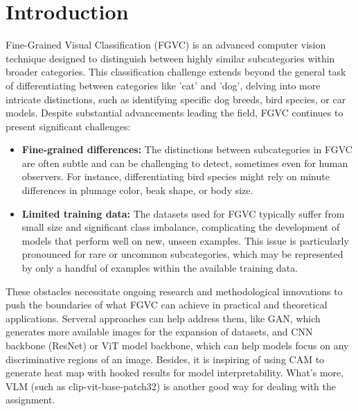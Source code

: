 \section{Introduction}
\label{sec:intro}

Fine-Grained Visual Classification (FGVC) is an advanced computer vision technique designed to distinguish between highly similar subcategories within broader categories. This classification challenge extends beyond the general task of differentiating between categories like 'cat' and 'dog', delving into more intricate distinctions, such as identifying specific dog breeds, bird species, or car models. Despite substantial advancements leading the field, FGVC continues to present significant challenges:

\begin{itemize}
    \item \textbf{Fine-grained differences:} The distinctions between subcategories in FGVC are often subtle and can be challenging to detect, sometimes even for human observers. For instance, differentiating bird species might rely on minute differences in plumage color, beak shape, or body size.
    \item \textbf{Limited training data:} The datasets used for FGVC typically suffer from small size and significant class imbalance, complicating the development of models that perform well on new, unseen examples. This issue is particularly pronounced for rare or uncommon subcategories, which may be represented by only a handful of examples within the available training data.
\end{itemize}

These obstacles necessitate ongoing research and methodological innovations to push the boundaries of what FGVC can achieve in practical and theoretical applications. Serveral approaches can help address them, like GAN, which generates more available images for the expansion of datasets, and CNN backbone 
(ResNet) or ViT model backbone, which can help models focus on any discriminative regions of an image. Besides, it is inspiring of using CAM to generate heat map with hooked results for model interpretability. What's more, VLM (such as clip-vit-base-patch32) is another good way for dealing with the assignment.

